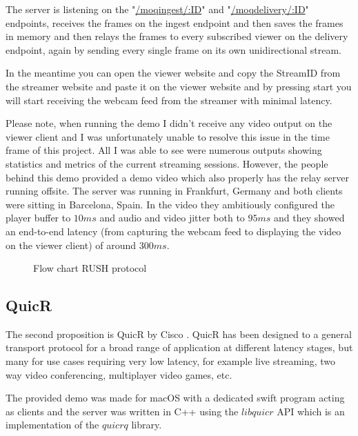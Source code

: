 \documentclass[conference]{IEEEtran}
\begin{document}
The server is listening on the "\url{/moqingest/:ID}" and "\url{/moqdelivery/:ID}" endpoints, receives the frames on the ingest endpoint and then saves the frames in memory and then relays the frames to every subscribed viewer on the delivery endpoint, again by sending every single frame on its own unidirectional stream.

In the meantime you can open the viewer website and copy the StreamID from the streamer website and paste it on the viewer website and by pressing start you will start receiving the webcam feed from the streamer with minimal latency.

Please note, when running the demo I didn't receive any video output on the viewer client and I was unfortunately unable to resolve this issue in the time frame of this project. All I was able to see were numerous outputs showing statistics and metrics of the current streaming sessions. However, the people behind this demo provided a demo video \cite{b18} which also properly has the relay server running offsite. The server was running in Frankfurt, Germany and both clients were sitting in Barcelona, Spain. In the video they ambitiously configured the player buffer to $10ms$ and audio and video jitter both to $95ms$ and they showed an end-to-end latency (from capturing the webcam feed to displaying the video on the viewer client) of around $300ms$.

\begin{figure}
    \caption{Flow chart RUSH protocol}
    \label{fig:rush}
\end{figure}

\subsection{QuicR}
The second proposition is QuicR by Cisco \cite{b19}. QuicR has been designed to a general transport protocol for a broad range of application at different latency stages, but many for use cases requiring very low latency, for example live streaming, two way video conferencing, multiplayer video games, etc.

The provided demo \cite{b20} was made for macOS with a dedicated swift program acting as clients and the server was written in C++ using the $libquicr$ \cite{b21} API which is an implementation of the $quicrq$ \cite{b22} library.
\end{document}
